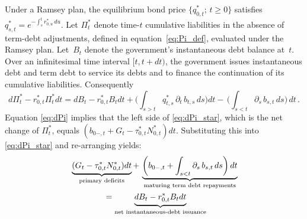 \documentclass[12pt]{article}
\newcommand{\NW}[1]{{\textcolor{blue}{#1}}}
\newcommand{\WJ}[1]{{\textcolor{red}{#1}}}
\begin{document}
{Under a Ramsey plan, the equilibrium bond price $\{q_{0,t}^*;\, t \ge 0\}$ satisfies $q_{s,t}^* = e^{-\int_s^t r_{0,u}^*\, du}$. 
%
Let $\Pi_t^*$ denote time-$t$ cumulative liabilities in the absence of term-debt adjustments,    defined in equation~\eqref{eq:Pi_def}, evaluated under the Ramsey plan. Let~$B_t$ denote the government's instantaneous debt balance at~$t$. 
Over an infinitesimal time interval $[t, t+dt)$, %
the government  issues instantaneous debt and term debt to service  its  debts and  to  finance the continuation of its cumulative liabilities.  %
Consequently 
\begin{equation}\label{eq:dPi_star}
d\Pi_t^* -r_{0, t}^*\Pi_t^*dt = %
{dB_t -r_{0, t}^*B_tdt} %
 + %
 {\biggl(\int_{s > t} q_{t,s}^*\, \partial_t\, b_{t,s}\, ds\biggr) dt}%
 -\, %
 {\biggl( \int_{s<t}\partial_s\, b_{s,t}\, ds\biggr)  \, dt}\, . 
\end{equation}
Equation \eqref{eq:dPi} implies that the left side of \eqref{eq:dPi_star}, which is the  net change of $\Pi_t^*$, 
equals  $(b_{0-,t} + G_t - \tau^\ast_{0,t} N^\ast_{0,t} ) d t.$ Substituting this into \eqref{eq:dPi_star} and re-arranging  yields: 
\begin{align}\label{eq:dPi_star2}
& \underbrace{(G_t - \tau^\ast_{0,t} N^\ast_{0,t} ) d t}_{\text{primary deficits}} + \, %
\underbrace{\biggl( b_{0-,t} + \int_{s<t}\partial_s\, b_{s,t}\, ds\biggr)  \, dt}_{\text{maturing term debt repayments}}
\notag \\
 &\quad \quad  \quad \quad =   \underbrace{dB_t -r_{0, t}^*B_tdt}_{\text{net instantaneous-debt issuance}}

\end{align}}
\end{document}
